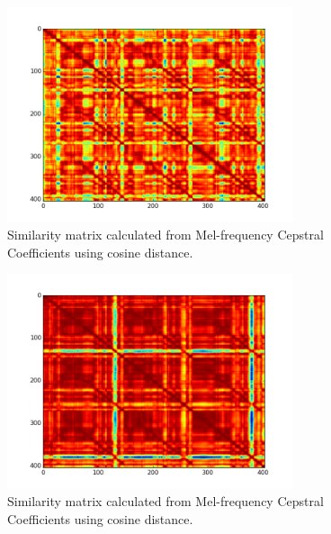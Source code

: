 \begin{figure}[b]
    \includegraphics[width=0.75\textwidth]{Figures/mfcc_ssm_cosine}
    \centering

  \caption{Similarity matrix calculated from Mel-frequency Cepstral Coefficients using cosine distance.}
  \label{fig:mfcccosine}
\end{figure}


\begin{figure}[b]
    \includegraphics[width=0.75\textwidth]{Figures/mfcc_ssm_synched}
    \centering

  \caption{Similarity matrix calculated from Mel-frequency Cepstral Coefficients using cosine distance.}
  \label{fig:mfcccorrelation}
\end{figure}